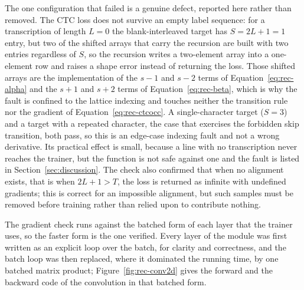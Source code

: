 The one configuration that failed is a genuine defect, reported here rather than removed.
The CTC loss does not survive an empty label sequence: for a transcription of length $L=0$ the blank-interleaved target has $S=2L+1=1$ entry, but two of the shifted arrays that carry the recursion are built with two entries regardless of $S$, so the recursion writes a two-element array into a one-element row and raises a shape error instead of returning the loss.
Those shifted arrays are the implementation of the $s-1$ and $s-2$ terms of Equation~\ref{eq:rec-alpha} and the $s+1$ and $s+2$ terms of Equation~\ref{eq:rec-beta}, which is why the fault is confined to the lattice indexing and touches neither the transition rule nor the gradient of Equation~\ref{eq:rec-ctcocc}.
A single-character target ($S=3$) and a target with a repeated character, the case that exercises the forbidden skip transition, both pass, so this is an edge-case indexing fault and not a wrong derivative.
Its practical effect is small, because a line with no transcription never reaches the trainer, but the function is not safe against one and the fault is listed in Section~\ref{sec:discussion}.
The check also confirmed that when no alignment exists, that is when $2L+1>T$, the loss is returned as infinite with undefined gradients; this is correct for an impossible alignment, but such samples must be removed before training rather than relied upon to contribute nothing.

The gradient check runs against the batched form of each layer that the trainer uses, so the faster form is the one verified.
Every layer of the module was first written as an explicit loop over the batch, for clarity and correctness, and the batch loop was then replaced, where it dominated the running time, by one batched matrix product; Figure~\ref{fig:rec-conv2d} gives the forward and the backward code of the convolution in that batched form.

